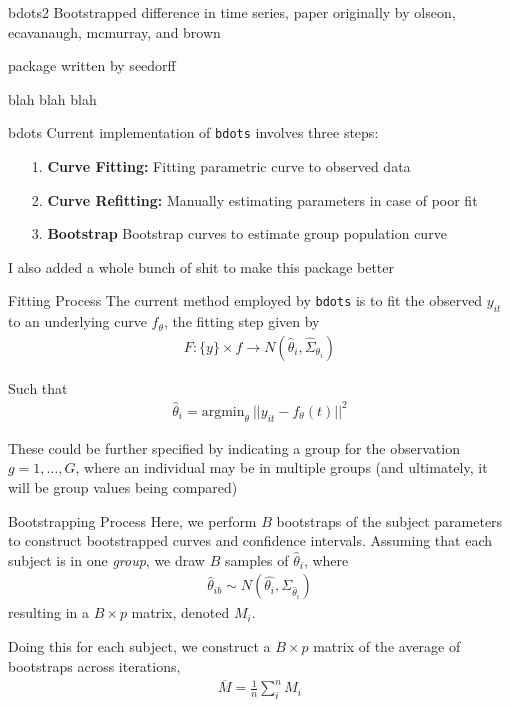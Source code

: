\documentclass{beamer}
\newcommand{\code}[1]{\texttt{#1}}
\begin{document}
\begin{frame}{bdots2}
Bootstrapped difference in time series, paper originally by olseon, ecavanaugh, mcmurray, and brown \newline

package written by seedorff \newline

blah blah blah
\end{frame}

\begin{frame}{bdots}
Current implementation of \code{bdots} involves three steps:
\begin{enumerate}
\item[1.] \textbf{Curve Fitting:} Fitting parametric curve to observed data
\item[2.] \textbf{Curve Refitting:} Manually estimating parameters in case of poor fit
\item[3.] \textbf{Bootstrap} Bootstrap curves to estimate group population curve \newline
\end{enumerate}
I also added a whole bunch of shit to make this package better
\end{frame}

\begin{frame}{Fitting Process}
The current method employed by \code{bdots} is to fit the observed $y_{it}$ to an underlying curve $f_{\theta}$, the fitting step given by 
  \begin{align*}
  F: \{y\} \times f \rightarrow N \left(\hat{\theta}_i, \hat{\Sigma}_{\theta_i} \right)
  \end{align*}

Such that
  \begin{align*}
  \hat{\theta}_i = \text{argmin}_{\theta} \  ||y_{it} - f_{\theta}(t)||^2
  \end{align*}

These could be further specified by indicating a group for the observation $g = 1, \dots, G$, where an individual may be in multiple groups (and ultimately, it will be group values being compared)
\end{frame}


\begin{frame}{Bootstrapping Process}
Here, we perform $B$ bootstraps of the subject parameters to construct bootstrapped curves and confidence intervals. Assuming that each subject is in one \textit{group}, we draw $B$ samples of $\hat{\theta}_i$, where 
\begin{align*}
\hat{\theta}_{ib} \sim N \left(\hat{\theta_i},  \Sigma_{\hat{\theta}_i} \right)
\end{align*}
resulting in a $B\times p$ matrix, denoted $M_i$. \newline 

Doing this for each subject, we construct a $B\times p$ matrix of the average of bootstraps across iterations, 
\begin{align*}
\overline{M} = \frac1n \sum_{i}^n M_i
\end{align*}
\end{frame}
\end{document}
